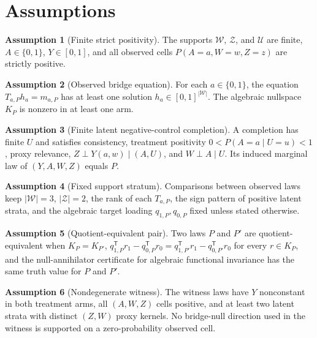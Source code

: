 \documentclass[11pt]{article}
\newcommand{\transpose}{\mathsf{T}}
\theoremstyle{definition}
\newtheorem{assumption}{Assumption}
\theoremstyle{plain}
\theoremstyle{remark}
\begin{document}
\section{Assumptions}
\begin{assumption}[Finite strict positivity]\label{ass:finite-positive}
The supports \(\mathcal W\), \(\mathcal Z\), and \(\mathcal U\) are finite, \(A\in\{0,1\}\), \(Y\in[0,1]\), and all observed cells \(P(A=a,W=w,Z=z)\) are strictly positive.
\end{assumption}

\begin{assumption}[Observed bridge equation]\label{ass:bridge-equation}
For each \(a\in\{0,1\}\), the equation \(T_{a,P}h_a=m_{a,P}\) has at least one solution \(h_a\in[0,1]^{|\mathcal W|}\). The algebraic nullspace \(K_P\) is nonzero in at least one arm.
\end{assumption}

\begin{assumption}[Finite latent negative-control completion]\label{ass:latent-completion}
A completion has finite \(U\) and satisfies consistency, treatment positivity \(0<P(A=a\mid U=u)<1\), proxy relevance, \(Z\perp Y(a,w)\mid(A,U)\), and \(W\perp A\mid U\). Its induced marginal law of \((Y,A,W,Z)\) equals \(P\).
\end{assumption}

\begin{assumption}[Fixed support stratum]\label{ass:fixed-stratum}
Comparisons between observed laws keep \(|\mathcal W|=3\), \(|\mathcal Z|=2\), the rank of each \(T_{a,P}\), the sign pattern of positive latent strata, and the algebraic target loading \(q_{1,P},q_{0,P}\) fixed unless stated otherwise.
\end{assumption}

\begin{assumption}[Quotient-equivalent pair]\label{ass:quotient-equivalent}
Two laws \(P\) and \(P'\) are quotient-equivalent when \(K_P=K_{P'}\), \(q_{1,P}^{\transpose}r_1-q_{0,P}^{\transpose}r_0=q_{1,P'}^{\transpose}r_1-q_{0,P'}^{\transpose}r_0\) for every \(r\in K_P\), and the null-annihilator certificate for algebraic functional invariance has the same truth value for \(P\) and \(P'\).
\end{assumption}

\begin{assumption}[Nondegenerate witness]\label{ass:nondegenerate-witness}
The witness laws have \(Y\) nonconstant in both treatment arms, all \((A,W,Z)\) cells positive, and at least two latent strata with distinct \((Z,W)\) proxy kernels. No bridge-null direction used in the witness is supported on a zero-probability observed cell.
\end{assumption}
\end{document}
